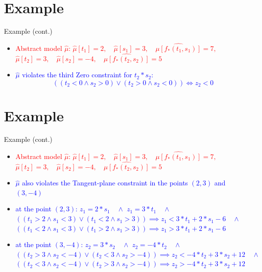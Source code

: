 \documentclass[]{beamer}
\begin{document}
\section{Example}
\begin{frame}{Example (cont.)}
    \begin{itemize}
        \item \textcolor{red}{Abstract model $\hat{\mu}$:  $\hat{\mu}[t_{1}] = 2, \quad \hat{\mu}[s_{1}] = 3, \quad \hat{\mu[f_{\ast}(t_{1}, s_{1})]} = 7,$ $\hat{\mu}[t_{2}] = 3, \quad \hat{\mu}[s_{2}] = -4, \quad \hat{\mu[f_{\ast}(t_{2}, s_{2})]} = 5$}
        \item \textcolor<1>{blue}{$\hat{\mu}$ violates the third Zero constraint for $t_{2} \ast s_{2}$:
    $$((t_{2} < 0 \wedge s_{2} > 0) \vee (t_{2} > 0 \wedge s_{2} < 0)) \Leftrightarrow z_{2} < 0$$}
    \end{itemize}
\end{frame}

\section{Example}
\begin{frame}{Example (cont.)}
    \begin{itemize}
        \item \textcolor{red}{Abstract model $\hat{\mu}$:  $\hat{\mu}[t_{1}] = 2, \quad \hat{\mu}[s_{1}] = 3, \quad \hat{\mu[f_{\ast}(t_{1}, s_{1})]} = 7,$ $\hat{\mu}[t_{2}] = 3, \quad \hat{\mu}[s_{2}] = -4, \quad \hat{\mu[f_{\ast}(t_{2}, s_{2})]} = 5$}
        \item \textcolor<1>{blue}{$\hat{\mu}$ also violates the Tangent-plane constraint in the points $(2, 3)$ and $(3, -4)$}
        \item \textcolor<2>{blue}{at the point $(2, 3)$: 
    $z_{1} = 2 \ast s_{1} \quad \wedge$ \quad
    $z_{1} = 3 \ast t_{1} \quad \wedge$
    $((t_{1} > 2 \wedge s_{1} < 3) \vee (t_{1} < 2 \wedge s_{1} > 3)) \implies z_{1} < 3 \ast t_{1} + 2 \ast s_{1} - 6 \quad \wedge$
     $((t_{1} < 2 \wedge s_{1} < 3) \vee (t_{1} > 2 \wedge s_{1} > 3)) \implies z_{1} > 3 \ast t_{1} + 2 \ast s_{1} - 6$}
		\item \textcolor<3>{blue}{at the point $(3, -4)$: 
    $z_{2} = 3 \ast s_{2} \quad \wedge$ \quad
    $z_{2} = -4 \ast t_{2} \quad \wedge$
    $((t_{2} > 3 \wedge s_{2} < -4) \vee (t_{2} < 3 \wedge s_{2} > -4)) \implies z_{2} < -4 \ast t_{2} + 3 \ast s_{2} + 12 \quad \wedge$
     $((t_{2} < 3 \wedge s_{2} < -4) \vee (t_{2} > 3 \wedge s_{2} > -4)) \implies z_{2} > -4 \ast t_{2} + 3 \ast s_{2} + 12$}
    \end{itemize}
\end{frame}
\end{document}
